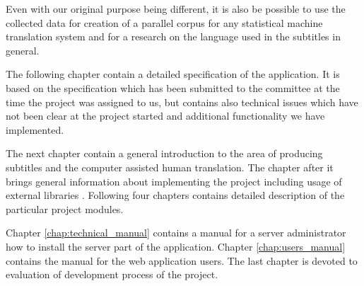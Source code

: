 Even with our original purpose being different, it is also be possible to use the collected data for creation of a parallel corpus for any statistical machine translation system and for a research on the language used in the subtitles in general.

The following chapter contain a detailed specification of the application. It is based on the specification which has been submitted to the committee at the time the project was assigned to us, but contains also technical issues which have not been clear at the project started and additional functionality we have implemented. 

The next chapter contain a general introduction to the area of producing subtitles and the computer assisted human translation. The chapter after it brings general information about implementing the project including usage of external libraries . Following four chapters contains detailed description of the particular project modules.

Chapter \ref{chap:technical_manual} contains a manual for a server administrator how to install the server part of the application. Chapter \ref{chap:users_manual} contains the manual for the web application users. The last chapter is devoted to evaluation of development process of the project.